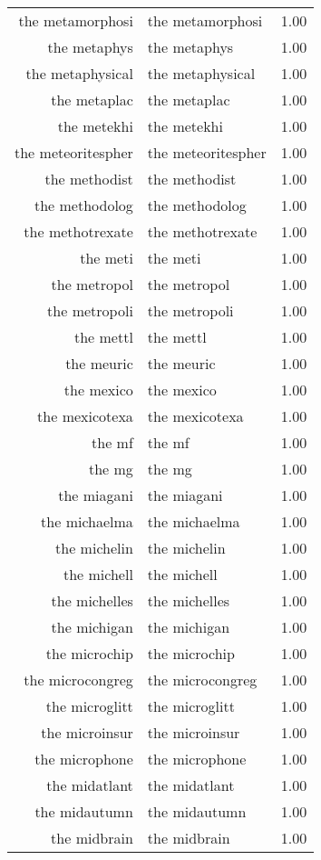 \begin{table}[ht]
\begin{tabular}{rlr}
  the metamorphosi & the metamorphosi & 1.00 \\ 
  the metaphys & the metaphys & 1.00 \\ 
  the metaphysical & the metaphysical & 1.00 \\ 
  the metaplac & the metaplac & 1.00 \\ 
  the metekhi & the metekhi & 1.00 \\ 
  the meteoritespher & the meteoritespher & 1.00 \\ 
  the methodist & the methodist & 1.00 \\ 
  the methodolog & the methodolog & 1.00 \\ 
  the methotrexate & the methotrexate & 1.00 \\ 
  the meti & the meti & 1.00 \\ 
  the metropol & the metropol & 1.00 \\ 
  the metropoli & the metropoli & 1.00 \\ 
  the mettl & the mettl & 1.00 \\ 
  the meuric & the meuric & 1.00 \\ 
  the mexico & the mexico & 1.00 \\ 
  the mexicotexa & the mexicotexa & 1.00 \\ 
  the mf & the mf & 1.00 \\ 
  the mg & the mg & 1.00 \\ 
  the miagani & the miagani & 1.00 \\ 
  the michaelma & the michaelma & 1.00 \\ 
  the michelin & the michelin & 1.00 \\ 
  the michell & the michell & 1.00 \\ 
  the michelles & the michelles & 1.00 \\ 
  the michigan & the michigan & 1.00 \\ 
  the microchip & the microchip & 1.00 \\ 
  the microcongreg & the microcongreg & 1.00 \\ 
  the microglitt & the microglitt & 1.00 \\ 
  the microinsur & the microinsur & 1.00 \\ 
  the microphone & the microphone & 1.00 \\ 
  the midatlant & the midatlant & 1.00 \\ 
  the midautumn & the midautumn & 1.00 \\ 
  the midbrain & the midbrain & 1.00 \\ 

\end{tabular}
\end{table}
